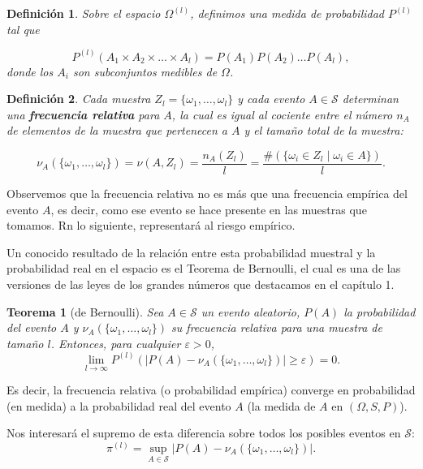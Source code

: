\documentclass{report}
\newtheorem{thm}{Teorema}[section]
\newtheorem{dfn}{Definición}[section]
\begin{document}
\begin{dfn}
    Sobre el espacio \( \Omega^{(l)} \), definimos una medida de probabilidad \( P^{(l)} \) tal que

\begin{equation}\label{def: probabilidad en espacio muestral}
P^{(l)}(A_1\times A_2 \times\dots\times A_l) = P(A_1) P(A_2) \dots P(A_l),
\end{equation}
donde los \( A_i \) son subconjuntos medibles de \( \Omega \).\newline
\end{dfn}


\begin{dfn}
Cada muestra \( Z_l = \{\omega_1, \dots, \omega_l\} \) y cada evento \( A \in \mathcal{S} \) determinan 
una \textbf{frecuencia relativa} para \( A \), la cual es igual al cociente entre 
el número \( n_A \) de elementos de la muestra que pertenecen a \( A \) y el tamaño 
total de la muestra:

\[
\nu_A(\{\omega_1,\dots, \omega_l\}) = \nu(A,Z_l) = \frac{n_A(Z_l)}{l} = \frac{\#(\{ \omega_i \in Z_l \mid \omega_i \in A \})}{l}.
\]

\end{dfn}

Observemos que la frecuencia relativa no es más que una frecuencia empírica del evento $A$, es decir, como ese evento
se hace presente en las muestras que tomamos. Rn lo siguiente, representará al riesgo
empírico. 

Un conocido resultado de la relación entre esta probabilidad muestral y la probabilidad real en el espacio
es el Teorema de Bernoulli, el cual es una de las versiones de las leyes de los grandes números que destacamos en el capítulo 1.
\bigskip
\begin{thm}[de Bernoulli]
Sea \( A \in \mathcal{S} \) un evento aleatorio, $P(A)$ la probabilidad del evento $A$ y $\nu_A(\{\omega_1,\dots, \omega_l\})$ su frecuencia relativa para una muestra de
tamaño $l$. Entonces, para cualquier $\varepsilon > 0$,
\[
    \lim_{l\to\infty} P^{(l)}\left(| P(A)-\nu_A(\{\omega_1,\dots, \omega_l\})| \geq \varepsilon\right) = 0.
\]
\end{thm}

Es decir, la frecuencia relativa (o probabilidad empírica) converge en probabilidad (en medida) a la probabilidad real del evento $A$ (la medida de $A$ en $(\Omega, S, P)$).\newline

Nos interesará el supremo de esta diferencia sobre todos los posibles eventos en $\mathcal{S}$:
\begin{equation}
    \pi^{(l)} = \sup_{A\in\mathcal{S}} |P(A)-\nu_A(\{\omega_1,\dots, \omega_l\})|. \label{def: funcion pi}
\end{equation}
\end{document}
